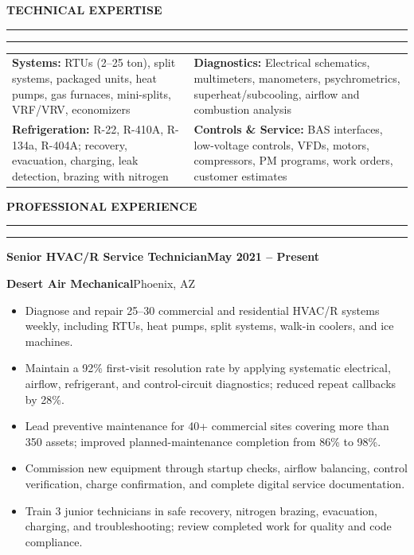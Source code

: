 \documentclass[10pt,letterpaper]{article}
\newcommand{\resumesection}[1]{%
  \vspace{4pt}%
  {\large\bfseries\color{navy}\MakeUppercase{#1}}\hspace{7pt}%
  {\color{orange}\rule[3.4pt]{0.28in}{1.5pt}}%
  \vspace{1.5pt}\par
  {\color{rule}\rule{\textwidth}{0.45pt}}%
  \vspace{1.8pt}\par
}
\newcommand{\job}[4]{%
  \textbf{\color{ink}#1}\hfill\textbf{\color{navy}#4}\par
  {\small\bfseries\color{blue}#2}\hfill{\small\color{muted}#3}\par
  \vspace{-1pt}%
}
\begin{document}
\resumesection{Technical Expertise}
\begin{tabularx}{\textwidth}{@{}>{\raggedright\arraybackslash}X@{\hspace{14pt}}>{\raggedright\arraybackslash}X@{}}
  \textbf{Systems:} RTUs (2--25 ton), split systems, packaged units, heat pumps, gas furnaces, mini-splits, VRF/VRV, economizers &
  \textbf{Diagnostics:} Electrical schematics, multimeters, manometers, psychrometrics, superheat/subcooling, airflow and combustion analysis \\
  \textbf{Refrigeration:} R-22, R-410A, R-134a, R-404A; recovery, evacuation, charging, leak detection, brazing with nitrogen &
  \textbf{Controls \& Service:} BAS interfaces, low-voltage controls, VFDs, motors, compressors, PM programs, work orders, customer estimates
\end{tabularx}

\resumesection{Professional Experience}

\job{Senior HVAC/R Service Technician}{Desert Air Mechanical}{Phoenix, AZ}{May 2021 -- Present}
\begin{itemize}
  \item Diagnose and repair 25--30 commercial and residential HVAC/R systems weekly, including RTUs, heat pumps, split systems, walk-in coolers, and ice machines.
  \item Maintain a 92\% first-visit resolution rate by applying systematic electrical, airflow, refrigerant, and control-circuit diagnostics; reduced repeat callbacks by 28\%.
  \item Lead preventive maintenance for 40+ commercial sites covering more than 350 assets; improved planned-maintenance completion from 86\% to 98\%.
  \item Commission new equipment through startup checks, airflow balancing, control verification, charge confirmation, and complete digital service documentation.
  \item Train 3 junior technicians in safe recovery, nitrogen brazing, evacuation, charging, and troubleshooting; review completed work for quality and code compliance.
\end{itemize}
\end{document}
